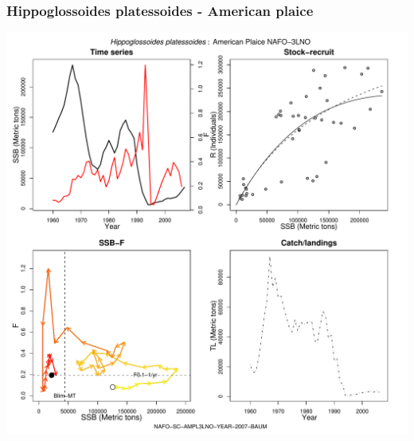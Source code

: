 \subsubsection{Hippoglossoides platessoides - American plaice}
\begin{center}
\includegraphics[width=1.2\textwidth]{../R/figures/NAFO-SC-AMPL3LNO-YEAR-2007-BAUM.pdf}
\end{center}

